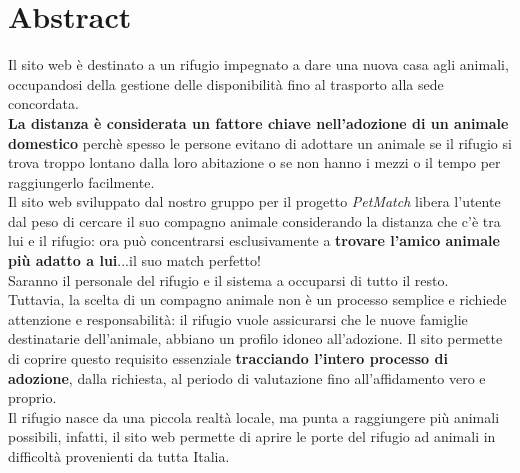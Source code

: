 \section{Abstract}
Il sito web è destinato a un rifugio impegnato a dare una nuova casa agli animali, occupandosi della gestione delle disponibilità fino al trasporto alla sede concordata.\\
\textbf{La distanza è considerata un fattore chiave nell'adozione di un animale domestico} perchè spesso le persone evitano di adottare un animale se il rifugio si trova troppo lontano dalla loro abitazione o se non hanno i mezzi o il tempo per raggiungerlo facilmente.\\
Il sito web sviluppato dal nostro gruppo per il progetto \textit{PetMatch} libera l'utente dal peso di cercare il suo compagno animale considerando la distanza che c'è tra lui e il rifugio: ora può concentrarsi esclusivamente a \textbf{trovare l'amico animale più adatto a lui}...il suo match perfetto!\\
Saranno il personale del rifugio e il sistema a occuparsi di tutto il resto.\\
Tuttavia, la scelta di un compagno animale non è un processo semplice e richiede attenzione e responsabilità: il rifugio vuole assicurarsi che le nuove famiglie destinatarie dell’animale, abbiano un profilo idoneo all’adozione. Il sito permette di coprire questo requisito essenziale \textbf{tracciando l’intero processo di adozione}, dalla richiesta, al periodo di valutazione fino all’affidamento vero e proprio. \\
Il rifugio nasce da una piccola realtà locale, ma punta a raggiungere più animali possibili, infatti, il sito web permette di aprire le porte del rifugio ad animali in difficoltà provenienti da tutta Italia.\\
